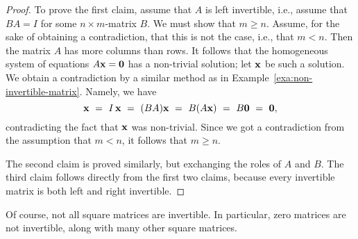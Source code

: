 \begin{proof}
  To prove the first claim, assume that $A$ is left invertible, i.e.,
  assume that $BA=I$ for some $n\times m$-matrix $B$. We must show
  that $m\geq n$. Assume, for the sake of obtaining a contradiction,
  that this is not the case, i.e., that $m<n$. Then the matrix $A$ has
  more columns than rows. It follows that the homogeneous system of
  equations $A\vect{x}=\vect{0}$ has a non-trivial solution; let
  $\vect{x}$ be such a solution. We obtain a contradiction by a
  similar method as in
  Example~\ref{exa:non-invertible-matrix}. Namely, we have
  \begin{equation*}
    \vect{x} ~=~ I\,\vect{x} ~=~ (BA)\vect{x} ~=~ B(A\vect{x}) ~=~ B\vect{0} ~=~
    \vect{0},
  \end{equation*}
  contradicting the fact that $\vect{x}$ was non-trivial.  Since we
  got a contradiction from the assumption that $m<n$, it follows that
  $m\geq n$.

  The second claim is proved similarly, but exchanging the roles of
  $A$ and $B$.  The third claim follows directly from the first two
  claims, because every invertible matrix is both left and right
  invertible.
\end{proof}

Of course, not all square matrices are invertible. In particular, zero
matrices are not invertible, along with many other square matrices.

